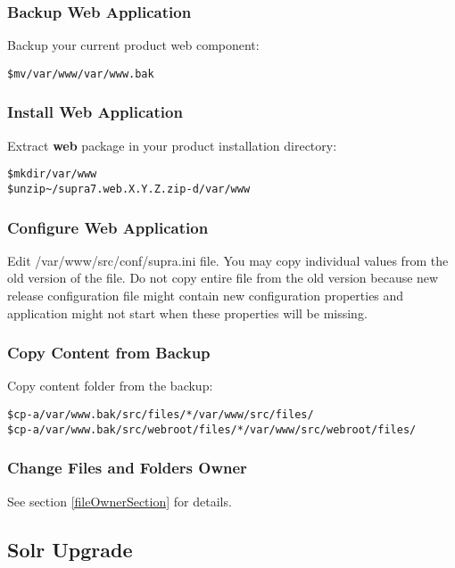 \documentclass[12pt]{article}
\newcommand{\vigPackageName}{supra7}
\newcommand{\vigPathToProject}{/var/www}
\newcommand{\vigPathToSrc}{/src}
\newcommand{\vigReleasePath}{\textasciitilde/}
\begin{document}
\subsubsection{Backup Web Application}
Backup your current product web component:

\begin{alltt}
\$ mv \vigPathToProject \vigPathToProject.bak
\end{alltt}

\subsubsection{Install Web Application}
Extract \textbf{web} package in your product installation directory:

\begin{alltt}
\$ mkdir \vigPathToProject
\$ unzip {\vigReleasePath}{\vigPackageName}.web.X.Y.Z.zip -d \vigPathToProject
\end{alltt}

\subsubsection{Configure Web Application}
Edit \textsf{\vigPathToProject\vigPathToSrc/conf/supra.ini} file. You may copy individual values from the old version of the file. Do not copy entire file from the old version because new release configuration file might contain new configuration properties and application might not start when these properties will be missing.

\subsubsection{Copy Content from Backup}
Copy content folder from the backup:

\begin{alltt}
\$ cp -a \vigPathToProject.bak\vigPathToSrc/files/* \vigPathToProject\vigPathToSrc/files/
\$ cp -a \vigPathToProject.bak\vigPathToSrc/webroot/files/* \vigPathToProject\vigPathToSrc/webroot/files/
\end{alltt}

\subsubsection{Change Files and Folders Owner}

See section \ref{fileOwnerSection} for details.

\subsection{Solr Upgrade}
\end{document}
